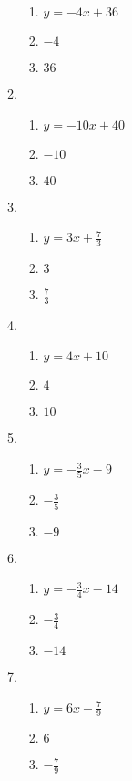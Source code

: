 \documentclass[a4paper,12pt]{article}
\begin{document}
\begin{enumerate}
\begin{multicols}{2}
\begin{enumerate}
\begin{enumerate}
        \item $y = -4x + 36$
        \item $-4$
        \item $36$
        \end{enumerate}
    \item
        \begin{enumerate}
        \item $y = -10x + 40$
        \item $-10$
        \item $40$
        \end{enumerate}
    \item
        \begin{enumerate}
        \item $y = 3x + \frac{7}{3}$
        \item $3$
        \item $\frac{7}{3}$
        \end{enumerate}
    \item
        \begin{enumerate}
        \item $y = 4x + 10$
        \item $4$
        \item $10$
        \end{enumerate}
    \item
        \begin{enumerate}
        \item $y = -\frac{3}{5}x - 9$
        \item $-\frac{3}{5}$
        \item $-9$
        \end{enumerate}
    \item
        \begin{enumerate}
        \item $y = -\frac{3}{4}x - 14$
        \item $-\frac{3}{4}$
        \item $-14$
        \end{enumerate}
    \item
        \begin{enumerate}
        \item $y = 6x - \frac{7}{9}$
        \item $6$
        \item $-\frac{7}{9}$
        \end{enumerate}
    \end{enumerate}
    \end{multicols}


\end{enumerate}
\end{document}
